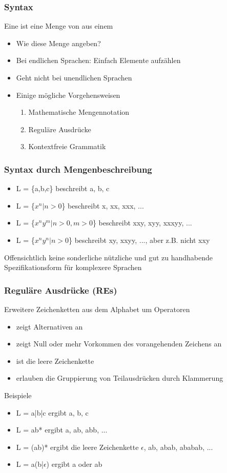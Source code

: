 \subsubsection*{Syntax}
Eine  ist eine Menge von  aus einem 
\begin{itemize}
	\item Wie diese Menge angeben?
	\item Bei endlichen Sprachen: Einfach Elemente aufzählen
	\item Geht nicht bei unendlichen Sprachen
	\item Einige mögliche Vorgehensweisen
	\begin{enumerate}
		\item Mathematische Mengennotation
		\item Reguläre Ausdrücke
		\item Kontextfreie Grammatik
	\end{enumerate}
\end{itemize}

\subsubsection*{Syntax durch Mengenbeschreibung}
\begin{itemize}
	\item L = \{a,b,c\} beschreibt a, b, c
	\item L = \{$x^{n} | n>0$\} beschreibt x, xx, xxx, ...
	\item L = \{$x^{n}y^{m}|n>0,m>0$\} beschreibt xxy, xyy, xxxyy, ...
	\item L = \{$x^{n}y^{n}|n>0$\} beschreibt xy, xxyy, ..., aber z.B. nicht xxy
\end{itemize}
Offensichtlich keine sonderliche nützliche und gut zu handhabende Spezifikationsform für komplexere Sprachen

\subsubsection*{Reguläre Ausdrücke (REs)}
Erweitere Zeichenketten aus dem Alphabet um Operatoren
\begin{itemize}
	\item \blue{|} zeigt Alternativen an
	\item \blue{*} zeigt Null oder mehr Vorkommen des vorangehenden Zeichens an
	\item \blue{$\epsilon$} ist die leere Zeichenkette
	\item {} erlauben die Gruppierung von Teilausdrücken durch Klammerung
\end{itemize}
Beispiele
\begin{itemize}
	\item L = a|b|c ergibt a, b, c
	\item L = ab* ergibt a, ab, abb, ...
	\item L = (ab)* ergibt die leere Zeichenkette $\epsilon$, ab, abab, ababab, ...
	\item L = a(b|$\epsilon$) ergibt a oder ab
\end{itemize}

